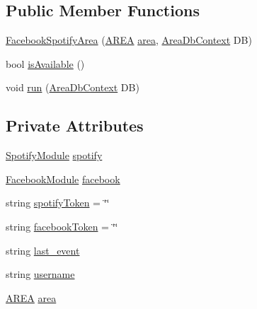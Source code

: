 \subsection*{Public Member Functions}
\begin{DoxyCompactItemize}
\item 
\mbox{\hyperlink{classArea_1_1Models_1_1FacebookSpotifyArea_af15433bc9d994b358ac7d6a4cce9c836}{Facebook\+Spotify\+Area}} (\mbox{\hyperlink{classArea_1_1Models_1_1AREA}{A\+R\+EA}} \mbox{\hyperlink{classArea_1_1Models_1_1FacebookSpotifyArea_abc59a0966bbec21ee29cf0214535542c}{area}}, \mbox{\hyperlink{classArea_1_1DAT_1_1AreaDbContext}{Area\+Db\+Context}} DB)
\item 
bool \mbox{\hyperlink{classArea_1_1Models_1_1FacebookSpotifyArea_aa98a5f78b4814107265c952496c50fcb}{is\+Available}} ()
\item 
void \mbox{\hyperlink{classArea_1_1Models_1_1FacebookSpotifyArea_ae574aa239311b4fc84d087adef335f3d}{run}} (\mbox{\hyperlink{classArea_1_1DAT_1_1AreaDbContext}{Area\+Db\+Context}} DB)
\end{DoxyCompactItemize}
\subsection*{Private Attributes}
\begin{DoxyCompactItemize}
\item 
\mbox{\hyperlink{classArea_1_1Models_1_1SpotifyModule}{Spotify\+Module}} \mbox{\hyperlink{classArea_1_1Models_1_1FacebookSpotifyArea_a8b986deb612a12826ccc6625f9f774a9}{spotify}}
\item 
\mbox{\hyperlink{classArea_1_1Models_1_1FacebookModule}{Facebook\+Module}} \mbox{\hyperlink{classArea_1_1Models_1_1FacebookSpotifyArea_a4bae14b0fd3befbc256ecf7bd557261d}{facebook}}
\item 
string \mbox{\hyperlink{classArea_1_1Models_1_1FacebookSpotifyArea_a4d5cd25335bcdabce156cfb4b479d70e}{spotify\+Token}} = \char`\"{}\char`\"{}
\item 
string \mbox{\hyperlink{classArea_1_1Models_1_1FacebookSpotifyArea_a0eed9b6d58dcb07a6c704884d12a0d6c}{facebook\+Token}} = \char`\"{}\char`\"{}
\item 
string \mbox{\hyperlink{classArea_1_1Models_1_1FacebookSpotifyArea_af4891cb5643274f6d5b05fd72248e5be}{last\+\_\+event}}
\item 
string \mbox{\hyperlink{classArea_1_1Models_1_1FacebookSpotifyArea_a50cb6f7d6d1d44a1c5ddd5997597fcab}{username}}
\item 
\mbox{\hyperlink{classArea_1_1Models_1_1AREA}{A\+R\+EA}} \mbox{\hyperlink{classArea_1_1Models_1_1FacebookSpotifyArea_abc59a0966bbec21ee29cf0214535542c}{area}}
\end{DoxyCompactItemize}


